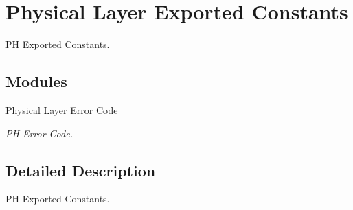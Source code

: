 \hypertarget{group___p_h___exported___constants}{}\section{Physical Layer Exported Constants}
\label{group___p_h___exported___constants}


PH Exported Constants.  


\subsection*{Modules}
\begin{DoxyCompactItemize}
\item 
\hyperlink{group___p_h___error___code}{Physical Layer Error Code}
\begin{DoxyCompactList}\small\item\em PH Error Code. \end{DoxyCompactList}\end{DoxyCompactItemize}


\subsection{Detailed Description}
PH Exported Constants. 

